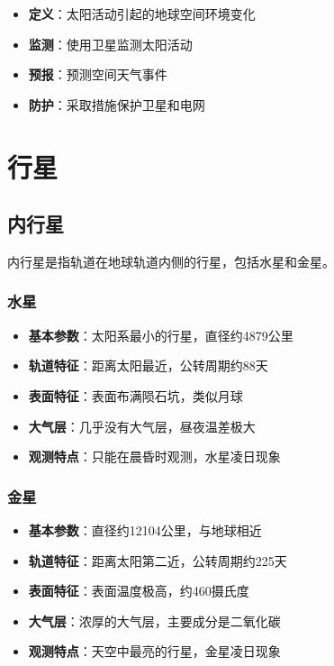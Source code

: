 \documentclass[12pt,UTF8]{ctexbook}
\begin{document}
\begin{itemize}
  \item \textbf{定义}：太阳活动引起的地球空间环境变化
  \item \textbf{监测}：使用卫星监测太阳活动
  \item \textbf{预报}：预测空间天气事件
  \item \textbf{防护}：采取措施保护卫星和电网
\end{itemize}

\chapter{行星}
\section{内行星}

内行星是指轨道在地球轨道内侧的行星，包括水星和金星。

\subsection{水星}

\begin{itemize}
  \item \textbf{基本参数}：太阳系最小的行星，直径约4879公里
  \item \textbf{轨道特征}：距离太阳最近，公转周期约88天
  \item \textbf{表面特征}：表面布满陨石坑，类似月球
  \item \textbf{大气层}：几乎没有大气层，昼夜温差极大
  \item \textbf{观测特点}：只能在晨昏时观测，水星凌日现象
\end{itemize}

\subsection{金星}

\begin{itemize}
  \item \textbf{基本参数}：直径约12104公里，与地球相近
  \item \textbf{轨道特征}：距离太阳第二近，公转周期约225天
  \item \textbf{表面特征}：表面温度极高，约460摄氏度
  \item \textbf{大气层}：浓厚的大气层，主要成分是二氧化碳
  \item \textbf{观测特点}：天空中最亮的行星，金星凌日现象
\end{itemize}
\end{document}
